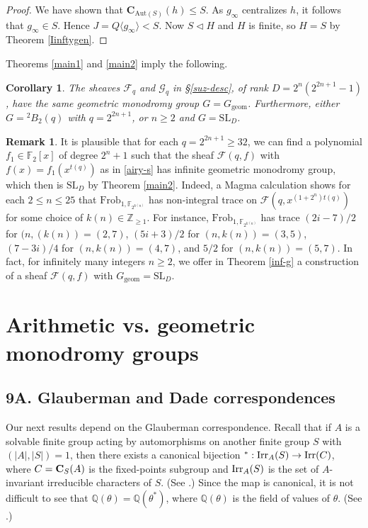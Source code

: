 \documentclass[11pt]{amsart}
\theoremstyle{plain}
\newtheorem{cor}[thm]{Corollary}
\theoremstyle{definition}
\newtheorem{rmk}[thm]{Remark}
\numberwithin{thm}{section}
\numberwithin{equation}{thm}
\newcommand{\Aut}{\mathrm{Aut}}
\def\irr#1{{\rm Irr}(#1)}
\def\cent#1#2{{\bf C}_{#1}(#2)}
\newcommand{\SL}{\mathrm{SL}}
\newcommand{\sF}{{\mathcal F}}
\newcommand{\sG}{{\mathcal G}}
\newcommand{\F}{{\mathbb F}}
\newcommand{\Q}{{\mathbb Q}}
\newcommand{\Z}{{\mathbb Z}}
\newcommand{\0}{\emptyset}
\newcommand{\CB}{{\mathbf C}}
\newcommand{\geo}{{\mathrm {geom}}}
\newcommand{\tw}[1]{{}^#1\!}
\newcommand{\Frob}{\mathrm{Frob}}
\begin{document}
\begin{proof}
We have shown that $\CB_{\Aut(S)}(h) \leq S$. As $g_\infty$ centralizes $h$, it follows that $g_\infty \in S$. Hence
$J = Q\langle g_\infty\rangle < S$. Now $S \lhd H$ and $H$ is finite, so $H=S$ by Theorem \ref{Iinftygen}.
\end{proof}

Theorems \ref{main1} and \ref{main2} imply the following.

\begin{cor}\label{main2c}
The sheaves $\sF_q$ and $\sG_q$ in \S\ref{suz-desc}, of rank $D=2^n(2^{2n+1}-1)$, have the same geometric monodromy group
$G=G_\geo$. Furthermore, either $G=\tw2 B_2(q)$ with $q=2^{2n+1}$, or $n \geq 2$ and $G = \SL_D$.
\end{cor}

\begin{rmk}\label{inf-ex}
It is plausible that for each $q = 2^{2n+1} \geq 32$, we can find a polynomial $f_1 \in \F_2[x]$ of degree $2^n+1$ such that the sheaf
$\sF(q,f)$ with $f(x)=f_1(x^{t(q)})$ as in \eqref{airy-s} has infinite geometric monodromy group, which then is $\SL_D$ by
Theorem \ref{main2}. Indeed, a {\sc Magma} calculation shows for each $2 \leq n \leq 25$ that 
$\Frob_{1,\F_{2^{k(n)}}}$ has non-integral trace on $\sF(q,x^{(1+2^n)t(q)})$ for some choice of $k(n) \in \Z_{\geq 1}$. 
For instance, $\Frob_{1,\F_{2^{k(n)}}}$ has 
trace $(2i-7)/2$ for $(n,(k(n))=(2,7)$, $(5i+3)/2$ for $(n,k(n))=(3,5)$, $(7-3i)/4$ for $(n,k(n))=(4,7)$, and 
$5/2$ for $(n,k(n))=(5,7)$. In fact, for infinitely many integers $n \geq 2$, we offer in Theorem \ref{inf-g} a construction of 
a sheaf $\sF(q,f)$ with $G_\geo=\SL_D$.  
\end{rmk}

\section{Arithmetic vs. geometric monodromy groups}
\subsection*{9A. Glauberman and Dade correspondences}
Our next results depend on the Glauberman correspondence. Recall that if $A$ is a solvable finite group acting
by automorphisms on another finite group $S$ with $(|A|,|S|)=1$, then there exists a canonical
bijection $^*:{\rm Irr}_A(S) \rightarrow \irr C$, where $C=\cent SA$ is the  fixed-points subgroup and ${\rm Irr}_A(S)$
is the set of  $A$-invariant irreducible characters of $S$.  (See \cite[Chapter 13]{Is}.)
Since the map is canonical, it is not difficult to see that $\Q(\theta)=\Q(\theta^*)$, where $\Q(\theta)$ is the field of values of $\theta$.
(See \cite[Problem 3.1]{Is}.) 
\end{document}
